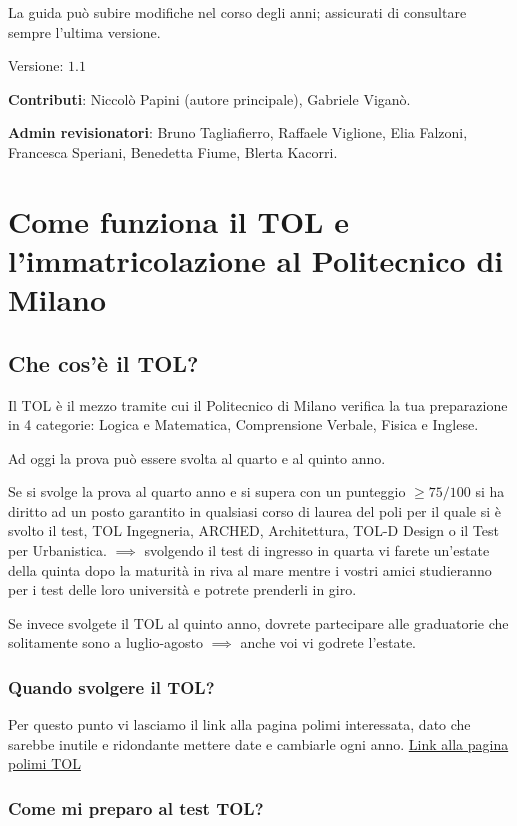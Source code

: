 \documentclass[legal]{polinetwork}
\begin{document}
La guida può subire modifiche nel corso degli anni; assicurati di consultare sempre l'ultima versione.

Versione: $1.1$

\textbf{Contributi}: Niccolò Papini (autore principale), Gabriele Viganò.

\textbf{Admin revisionatori}: Bruno Tagliafierro, Raffaele Viglione, Elia Falzoni, Francesca Speriani, Benedetta Fiume, Blerta Kacorri.

\section{Come funziona il TOL e l'immatricolazione al Politecnico di Milano}


\subsection{Che cos'è il TOL?}


Il TOL è il mezzo tramite cui il Politecnico di Milano verifica la tua preparazione in 4 categorie: Logica e Matematica, Comprensione Verbale, Fisica e Inglese.

Ad oggi la prova può essere svolta al quarto e al quinto anno.

Se si svolge la prova al quarto anno e si supera con un punteggio $\geq 75/100$ si ha diritto ad un posto garantito in qualsiasi corso di laurea del poli per il quale si è svolto il test, TOL Ingegneria, ARCHED, Architettura, TOL-D Design o il Test per Urbanistica. $\implies$ svolgendo il test di ingresso in quarta vi farete un'estate della quinta dopo la maturità in riva al mare mentre i vostri amici studieranno per i test delle loro università e potrete prenderli in giro.

Se invece svolgete il TOL al quinto anno, dovrete partecipare alle graduatorie che solitamente sono a luglio-agosto $\implies$ anche voi vi godrete l'estate.

\subsubsection{Quando svolgere il TOL?}


Per questo punto vi lasciamo il link alla pagina polimi interessata, dato che sarebbe inutile e ridondante mettere date e cambiarle ogni anno. \href{https://www.polimi.it/futuri-studenti/test-e-ammissione/laurea/ingegneria/quando-iscriversi-al-tol}{Link alla pagina polimi TOL}

\subsubsection{Come mi preparo al test TOL?}
\end{document}
